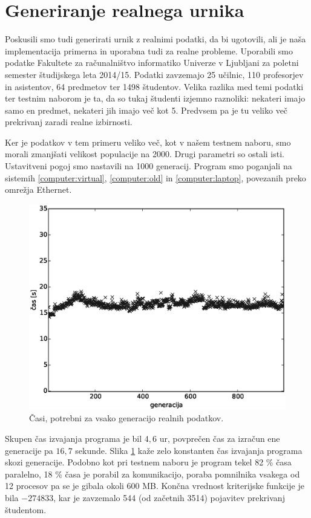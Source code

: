 \documentclass[a4paper,12pt]{book}
\begin{document}
\section{Generiranje realnega urnika}
Poskusili smo tudi generirati urnik z realnimi podatki, da bi ugotovili, ali je naša implementacija primerna in uporabna tudi za realne probleme. Uporabili smo podatke Fakultete za računalništvo informatiko Univerze v Ljubljani za poletni semester študijskega leta 2014/15. Podatki zavzemajo 25 učilnic, 110 profesorjev in asistentov, 64 predmetov ter 1498 študentov. Velika razlika med temi podatki ter testnim naborom je ta, da so tukaj študenti izjemno raznoliki: nekateri imajo samo en predmet, nekateri jih imajo več kot 5. Predvsem pa je tu veliko več prekrivanj zaradi realne izbirnosti. 

Ker je podatkov v tem primeru veliko več, kot v našem testnem naboru, smo morali zmanjšati velikost populacije na 2000. Drugi parametri so ostali isti. Ustavitveni pogoj smo nastavili na 1000 generacij. Program smo poganjali na sistemih \ref{computer:virtual}, \ref{computer:old} in \ref{computer:laptop}, povezanih preko omrežja Ethernet. 

\begin{figure}
	\centering
	\includegraphics[scale=0.6]{res/generation-time-three-eth-REAL.eps}
	\caption{Časi, potrebni za vsako generacijo realnih podatkov. }
	\label{pic:generation-time-REAL}
\end{figure}

Skupen čas izvajanja programa je bil $4{,}6$ ur, povprečen čas za izračun ene generacije pa $16{,}7$ sekunde. Slika \ref{pic:generation-time-REAL} kaže zelo konstanten čas izvajanja programa skozi generacije. Podobno kot pri testnem naboru je program tekel 82 \% časa paralelno, 18 \% časa je porabil za komunikacijo, poraba pomnilnika vsakega od 12 procesov pa se je gibala okoli 600 MB. Končna vrednost kriterijske funkcije je bila $-274833$, kar je zavzemalo 544 (od začetnih 3514) pojavitev prekrivanj študentom. 
\end{document}
